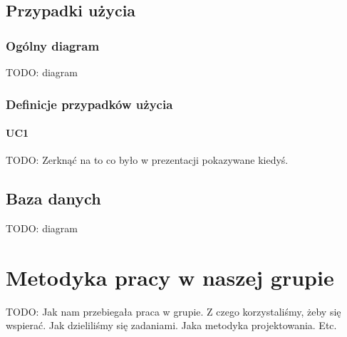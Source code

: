 \documentclass[pdflatex,11pt]{aghdpl}
\begin{document}
\section{Przypadki użycia}

\subsection{Ogólny diagram}

TODO: diagram


\subsection{Definicje przypadków użycia}

\subsubsection*{UC1}

TODO: Zerknąć na to co było w prezentacji pokazywane kiedyś.


\section{Baza danych}

TODO: diagram




\chapter{Metodyka pracy w naszej grupie}

TODO: Jak nam przebiegała praca w grupie. Z czego korzystaliśmy, żeby się wspierać. Jak dzieliliśmy się zadaniami. Jaka metodyka projektowania. Etc.


\end{document}
